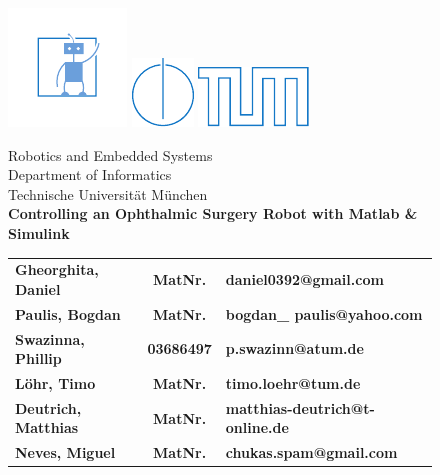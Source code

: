 \begin{figure}[!h]

  \includegraphics{./images/knoll-blue.pdf}  \includegraphics{./images/IN.pdf} \hfill \includegraphics{./images/tumlogo.pdf}

  \vspace*{1cm}
  {\large \textsf{Robotics and Embedded Systems}}\\
  {\large \textsf{Department of Informatics}}\\
  {\large \textsf{Technische Universit{\"a}t M{\"u}nchen}}\\




  \vspace*{5cm}
%
%
%
%
  {\color{tumblue} \Huge \bf \textsf{Controlling an Ophthalmic Surgery Robot with Matlab \& Simulink}}\\  %

  \vspace*{1cm}
%
%
%
%

  \begin{tabular}{l c l}
  	\Large \bf \textsf{Gheorghita, Daniel} & \Large \bf \textsf{MatNr.} & \Large \bf \textsf{daniel0392@gmail.com}\\
  	\Large \bf \textsf{Paulis, Bogdan} & \Large \bf \textsf{MatNr.} & \Large \bf \textsf{bogdan\_ paulis@yahoo.com}\\
  	\Large \bf \textsf{Swazinna, Phillip} & \Large \bf \textsf{03686497} & \Large \bf \textsf{p.swazinn@atum.de}\\
  	\Large \bf \textsf{L\" ohr, Timo} & \Large \bf \textsf{MatNr.} & \Large \bf \textsf{timo.loehr@tum.de}\\
  	\Large \bf \textsf{Deutrich, Matthias} & \Large \bf \textsf{MatNr.} & \Large \bf \textsf{matthias-deutrich@t-online.de}\\
  	\Large \bf \textsf{Neves, Miguel} & \Large \bf \textsf{MatNr.} & \Large \bf \textsf{chukas.spam@gmail.com}
  \end{tabular}


\end{figure}
